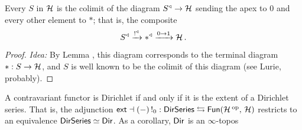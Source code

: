 \begin{lem}\label{lem:every.type.weakly.contractible.colimit}
  Every $S$ in $\operatorname{\mathcal{H}}$ is the colimit of the diagram $S^{\triangleleft} \to \operatorname{\mathcal{H}}$
sending the apex to $0$ and every other element to $\ast$; that is, the
composite
$$S^{\triangleleft} \xrightarrow{\operatorname{!}^{\triangleleft}} \ast^{\triangleleft} \xrightarrow{0 \to
  1} \operatorname{\mathcal{H}}.$$
\end{lem}
\begin{proof}
\emph{Idea:} By Lemma \label{lem:cone.initial.equivalence}, this diagram
corresponds to the terminal diagram $\ast : S \to \operatorname{\mathcal{H}}$, and $S$ is well known to
be the colimit of this diagram (see Lurie, probably).
\end{proof}

\begin{thm}\label{thm:dirichlet.series.functors.equivalence}
  A contravariant functor is Dirichlet if and only if it is the extent of a
  Dirichlet series. That is, the adjunction $\mathsf{{ext}} \dashv (-)\operatorname{!}_0 : \operatorname{\mathsf{{DirSeries}}} \leftrightarrows
  \operatorname{\mathsf{{Fun}}}(\operatorname{\mathcal{H}}\operatorname{^\text{op}},\, \operatorname{\mathcal{H}})$ restricts to an equivalence $\operatorname{\mathsf{{DirSeries}}} \simeq \operatorname{\mathsf{{Dir}}}$. As
  a corollary, $\operatorname{\mathsf{{Dir}}}$ is an $\infty$-topos
\end{thm}
